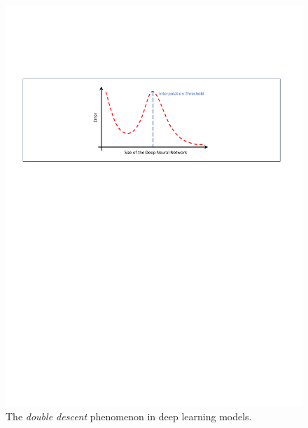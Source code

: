 
\begin{figure}[tbh]
    \begin{center}
        \includegraphics[width=1\linewidth]{chapter5/fig/double_descent.pdf}
    \end{center}
    \vspace{-5mm}
    \caption{
        \small  The \textit{double descent} phenomenon in deep learning models.
    }
    \label{ch5:fig:double_descent}
\end{figure}